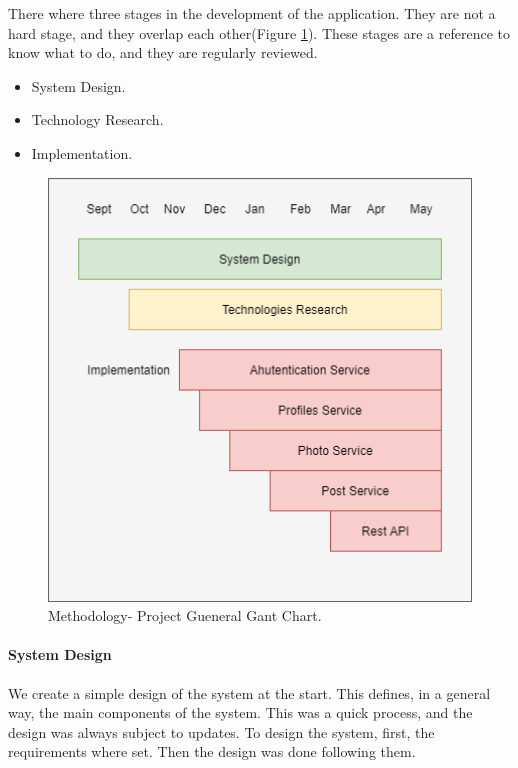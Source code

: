 There where three stages in the development of the application. They are not a hard stage, and they overlap each other(Figure \ref{methodology:stages}). These stages are a reference to know what to do, and they are regularly reviewed.

\begin{itemize}
	\item System Design.
	\item Technology Research.
	\item Implementation.
\end{itemize}

\begin{figure}
	\begin{center}
		\includegraphics[width=120mm,scale=1]{img/metodology/gueneral-gant.png}
		\caption{Methodology- Project Gueneral Gant Chart.}
		\label{methodology:stages}
	\end{center}
	
\end{figure}

\paragraph{System Design}

We create a simple design of the system at the start. This defines, in a general way, the main components of the system. This was a quick process, and the design was always subject to updates.
To design the system, first, the requirements where set. Then the design was done following them.


